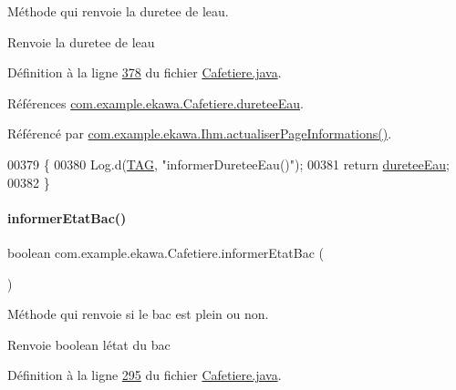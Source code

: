 Méthode qui renvoie la duretee de l\textquotesingle{}eau. 

\begin{DoxyReturn}{Renvoie}
la duretee de l\textquotesingle{}eau 
\end{DoxyReturn}


Définition à la ligne \hyperlink{_cafetiere_8java_source_l00378}{378} du fichier \hyperlink{_cafetiere_8java_source}{Cafetiere.\+java}.



Références \hyperlink{_cafetiere_8java_source_l00101}{com.\+example.\+ekawa.\+Cafetiere.\+duretee\+Eau}.



Référencé par \hyperlink{_ihm_8java_source_l00919}{com.\+example.\+ekawa.\+Ihm.\+actualiser\+Page\+Informations()}.


\begin{DoxyCode}
00379     \{
00380         Log.d(\hyperlink{classcom_1_1example_1_1ekawa_1_1_cafetiere_aa0c1fd99a2508b06c462aea17034aa91}{TAG}, \textcolor{stringliteral}{"informerDureteeEau()"});
00381         \textcolor{keywordflow}{return} \hyperlink{classcom_1_1example_1_1ekawa_1_1_cafetiere_aafc365a43172fca9166fb2a9006c6ecf}{dureteeEau};
00382     \}
\end{DoxyCode}
\mbox{\label{classcom_1_1example_1_1ekawa_1_1_cafetiere_a1e5aad72cec77a755c8b70eb1be5e6e5}} 
\paragraph{\texorpdfstring{informer\+Etat\+Bac()}{informerEtatBac()}}
{\footnotesize\ttfamily boolean com.\+example.\+ekawa.\+Cafetiere.\+informer\+Etat\+Bac (\begin{DoxyParamCaption}{ }\end{DoxyParamCaption})}



Méthode qui renvoie si le bac est plein ou non. 

\begin{DoxyReturn}{Renvoie}
boolean l\textquotesingle{}état du bac 
\end{DoxyReturn}


Définition à la ligne \hyperlink{_cafetiere_8java_source_l00295}{295} du fichier \hyperlink{_cafetiere_8java_source}{Cafetiere.\+java}.



